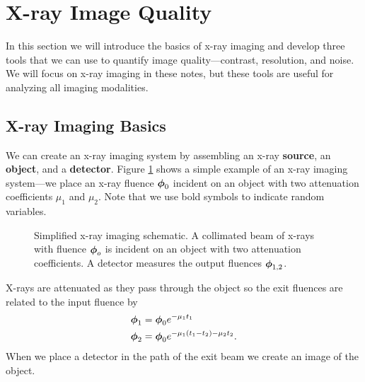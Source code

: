 \documentclass[mphy386-notes.tex]{subfiles}
\begin{document}
\section{X-ray Image Quality}
In this section we will introduce the basics of x-ray imaging and develop three
tools that we can use to quantify image quality---contrast, resolution, and
noise. We will focus on x-ray imaging in these notes, but these tools are
useful for analyzing all imaging modalities.

\subsection{X-ray Imaging Basics}
We can create an x-ray imaging system by assembling an x-ray \textbf{source}, an
\textbf{object}, and a \textbf{detector}. Figure \ref{fig:simple} shows a simple
example of an x-ray imaging system---we place an x-ray fluence $\boldsymbol{\phi}_0$
incident on an object with two attenuation coefficients $\mu_1$ and $\mu_2$. Note that we use bold symbols to indicate random variables.
\begin{figure}[h]
\begin{center}
\end{center}
\captionsetup{width=1.0\linewidth}
\caption{Simplified x-ray imaging schematic. A collimated beam of x-rays with
  fluence $\boldsymbol{\phi}_o$ is incident on an object with two attenuation
  coefficients. A detector measures the output fluences $\boldsymbol{\phi}_{1,2}$.}
\label{fig:simple}
\end{figure}
X-rays are attenuated as they pass through the object so the exit fluences are
related to the input fluence by
\begin{align}
  \boldsymbol{\phi}_1 &= \boldsymbol{\phi}_0e^{-\mu_1 t_1}\\
  \boldsymbol{\phi}_2 &= \boldsymbol{\phi}_0e^{-\mu_1(t_1 - t_2) - \mu_2t_2}. 
\end{align}
When we place a detector in the path of the exit beam we create an image of the
object. 
\end{document}
